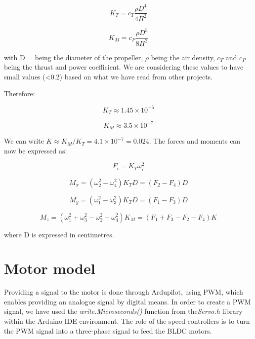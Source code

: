 \begin{equation}
	K_{T}=c_{T}\frac{\rho D^{4}}{4\Pi^{2}}
\end{equation}

\begin{equation}
	K_{M}=c_{P}\frac{\rho D^{5}}{8\Pi^{2}}
\end{equation}

with D = being the diameter of the propeller, $\rho$ being the air density, $ c_{T} $ and $ c_{P} $ being the thrust and power coefficient. We are considering these values to have small values (<0.2) based on what we have read from other projects.

Therefore\cite{Report1}:

\begin{equation}
	K_{T}\approx 1.45\times10^{-5}
\end{equation}

\begin{equation}
	K_{M} \approx 3.5\times10^{-7}
\end{equation}

We can write $K \approx K_{M}/K_{T}=4.1\times10^{-7}=0.024$. The forces and moments can now be expressed as:

\begin{equation}
\label{motor1} 
	F_{i}=K_{T}\omega_{i}^{2}
\end{equation}

\begin{equation}
\label{motor2} 
	M_{x}=(\omega_{2}^{2}-\omega_{4}^{2})K_{T}D=(F_{2}-F_{4})D
\end{equation}

\begin{equation}
\label{motor3} 
	M_{y}=(\omega_{1}^{2}-\omega_{3}^{2})K_{T}D=(F_{1}-F_{3})D
\end{equation}

\begin{equation}
\label{motor4} 
	M_{z}=(\omega_{1}^{2}+\omega_{3}^{2}-\omega_{2}^{2}-\omega_{4}^{2})K_{M}=(F_{1}+F_{3}-F_{2}-F_{4})K
\end{equation}

where D is expressed in centimetres.

\section{Motor model}
Providing a signal to the motor is done through Ardupilot, using PWM, which enables providing an analogue signal by digital means.  In order to create a PWM signal, we have used the \textit{write.Microseconds()} function from the\textit{Servo.h} library within the Arduino IDE environment. The role of the speed controllers is to turn the PWM signal into a three-phase signal to feed the BLDC motors.

